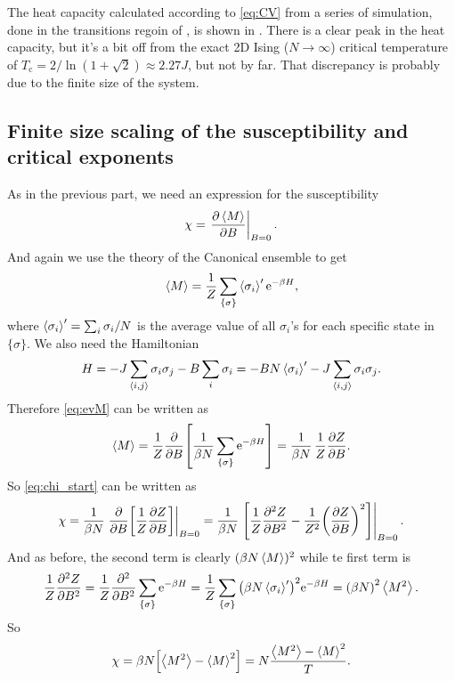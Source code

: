 \documentclass[11pt,letter, swedish, english
]{article}
\newcommand{\Tc}{\ensuremath{T_{\text{c}}}}
\begin{document}
The heat capacity calculated according to \eqref{eq:CV} from a
series of simulation, done in the transitions regoin of
, is shown in . There is a clear peak
in the heat capacity, but it's a bit off from the exact 2D Ising
($N\to\infty$) critical temperature of 
$\Tc = 2/\ln(1+\sqrt2) \approx 2.27J$, but not by far. That
discrepancy is probably due to the finite size of the system.


\subsection{Finite size scaling of the susceptibility and critical exponents}
As in the previous part, we need an expression for the susceptibility
\begin{equation}\label{eq:chi_start}
\chi = \eval{\pdv{\ev{M}}{B}}_{B=0}.
\end{equation}
And again we use the theory of the Canonical ensemble to get
\begin{equation}\label{eq:evM}
\ev{M} = \frac{1}{Z}\sum_{\{\sigma\}} \ev{\sigma_i}'\ee^{-\beta H},
\end{equation}
where $\ev{\sigma_i}' = \sum_i\sigma_i/N$ is the
average\footnotemark{} value of all $\sigma_i$'s for each specific
state in $\{\sigma\}$. We also need the Hamiltonian
\begin{equation}
H = -J\sum_{\ev{i, j}} \sigma_i\sigma_j
-B\sum_{i} \sigma_i
=-BN\ev{\sigma_i}' -J\sum_{\ev{i, j}} \sigma_i\sigma_j.
\end{equation}
Therefore \eqref{eq:evM} can be written as
\begin{equation}
\ev{M} = \frac{1}{Z} 
\pdv{B}\qty[\frac{1}{\beta N}\sum_{\{\sigma\}}\ee^{-\beta H}]
=\frac{1}{\beta N}\,\frac{1}{Z}\pdv{Z}{B}.
\end{equation}
So \eqref{eq:chi_start} can be written as
\begin{equation}
\chi = \frac{1}{\beta N} 
\eval{\pdv{B}\qty[\frac{1}{Z}\pdv{Z}{B}]}_{B=0}
=\frac{1}{\beta N} 
\eval{\qty[\frac{1}{Z}\pdv[2]{Z}{B}
-\frac{1}{Z^2}\qty(\pdv{Z}{B})^2]}_{B=0}.
\end{equation}
And as before, the second term is clearly $(\beta N\ev{M})^2$ while te
first term is
\begin{equation}
\frac{1}{Z}\pdv[2]{Z}{B}
=\frac{1}{Z}\pdv[2]{B}\sum_{\{\sigma\}}\ee^{-\beta H}
=\frac{1}{Z}\sum_{\{\sigma\}}
\qty(\beta N\ev{\sigma_i}')^2\ee^{-\beta H}
=\qty(\beta N)^2\ev{M^2}.
\end{equation}
So
\begin{equation}\label{eq:chi}
\chi =\beta N \qty[\ev{M^2} - \ev{M}^2]
=N \frac{\ev{M^2} - \ev{M}^2}{T}.
\end{equation}
\end{document}
